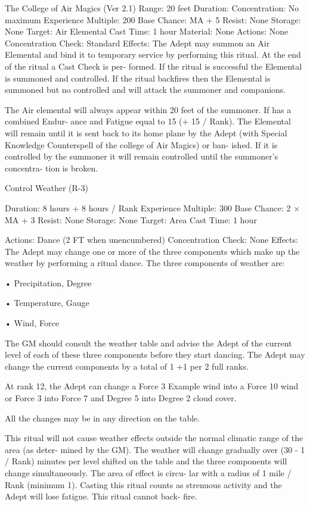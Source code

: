 \begin{Chapter}{The College of Air Magics (Ver 2.1)}
Range: 20 feet 
Duration: Concentration: No maximum 
Experience Multiple: 200 
Base Chance: MA + 5%
Resist: None 
Storage: None 
Target: Air Elemental 
Cast Time: 1 hour 
Material: None 
Actions: None 
Concentration Check: Standard 
Effects: The Adept may summon an Air Elemental 
and bind it to temporary service by performing this 
ritual. At the end of the ritual a Cast Check is per-
formed.  If  the  ritual  is  successful  the  Elemental  is 
summoned  and  controlled.  If  the  ritual  backfires 
then the Elemental is summoned but no controlled 
and will attack the summoner and companions. 

The  Air  elemental  will  always  appear  within  20 
feet  of  the  summoner.  If  has  a  combined  Endur-
ance  and  Fatigue  equal  to  15  (+  15  /  Rank).  The 
Elemental  will  remain  until  it  is  sent  back  to  its 
home plane by the Adept (with Special Knowledge 
Counterspell of the college of Air Magics) or ban-
ished.  If  it  is  controlled  by  the  summoner  it  will 
remain controlled until the summoner’s concentra-
tion is broken. 

Control Weather (R-3) 

Duration: 8 hours + 8 hours / Rank 
Experience Multiple: 300 
Base Chance: 2 × MA + 3%
Resist: None 
Storage: None 
Target: Area 
Cast Time: 1 hour 

Actions: Dance (2 FT when unencumbered) 
Concentration Check: None 
Effects: The Adept may change one or more of the 
three  components  which  make  up  the  weather  by 
performing a ritual dance. The three components of 
weather are:  

• Precipitation, Degree  

• Temperature, Gauge  

• Wind, Force 

The  GM  should  consult  the  weather  table  and 
advise  the  Adept  of  the  current  level  of  each  of 
these  three  components  before  they  start  dancing. 
The Adept may change the current components by 
a total of 1 +1 per 2 full ranks. 

At rank 12, the Adept can change a Force 3 
Example 
wind  into  a  Force  10  wind  or  Force  3  into  Force  7  and 
Degree 5 into Degree 2 cloud cover. 

All  the  changes  may  be  in  any  direction  on  the 
table. 

This  ritual  will  not  cause  weather  effects  outside 
the  normal  climatic  range  of  the  area  (as  deter-
mined  by  the  GM).  The  weather  will  change 
gradually  over  (30  -  1  /  Rank)  minutes  per  level 
shifted  on the  table  and  the  three  components  will 
change simultaneously. The area of effect is circu-
lar  with  a  radius  of  1  mile  /  Rank  (minimum  1). 
Casting this ritual counts as strenuous activity and 
the Adept will lose fatigue. This ritual cannot back-
fire. 


\end{Chapter}
